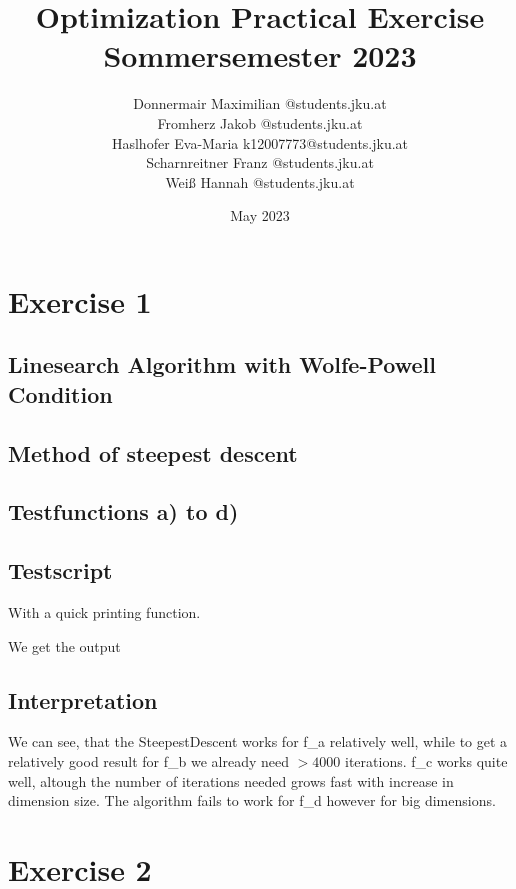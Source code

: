 \documentclass{article}
\title{Optimization Practical Exercise \\ Sommersemester 2023}
\author{Donnermair Maximilian @students.jku.at\\ Fromherz Jakob @students.jku.at\\Haslhofer Eva-Maria  k12007773@students.jku.at \\ Scharnreitner Franz @students.jku.at\\ Weiß Hannah @students.jku.at } %
\date{May 2023}
\begin{document}
\maketitle

\newpage

\section{Exercise 1}

\subsection{Linesearch Algorithm with Wolfe-Powell Condition}


\subsection{Method of steepest descent}



\subsection{Testfunctions a) to d)}








\subsection{Testscript}


With a quick printing function.


We get the output

\subsection{Interpretation}
We can see, that the SteepestDescent works for f\_a relatively well, while to get a relatively good result for f\_b we already need $>4000$ iterations.
f\_c works quite well, altough the number of iterations needed grows fast with increase in dimension size. The algorithm fails to work for f\_d however for big dimensions.

\section{Exercise 2}
\end{document}
